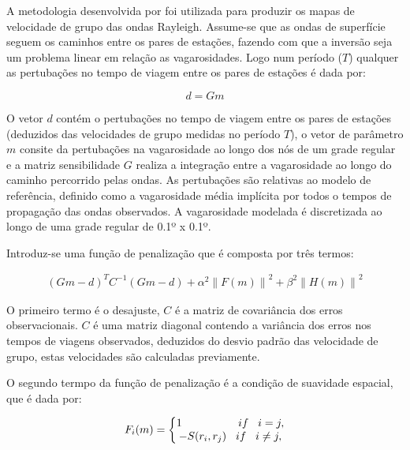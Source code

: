 A metodologia desenvolvida por  \cite{barmin_fast_2001} foi utilizada para produzir os mapas de velocidade de grupo das ondas Rayleigh. Assume-se que as ondas de superfície seguem os caminhos entre os pares de estações, fazendo com que a inversão seja um problema linear em relação as vagarosidades. Logo num período ($T$) qualquer as pertubações no tempo de viagem entre os pares de estações é dada por:

\begin{equation}
d=Gm
\end{equation} 

O vetor $d$ contém o pertubações no tempo de viagem entre os pares de estações (deduzidos das velocidades de grupo medidas no período $T$), o vetor de parâmetro $m$ consite da pertubações na vagarosidade ao longo dos nós de um grade regular e a matriz sensibilidade $G$ realiza a integração entre a vagarosidade ao longo do caminho percorrido pelas ondas. As pertubações são relativas ao modelo de referência, definido como a vagarosidade média implícita por todos o tempos de propagação das ondas observados. A vagarosidade modelada é discretizada ao longo de uma grade regular de 0.1º x 0.1º. 

Introduz-se uma função de penalização que é composta por três termos:

\begin{eqnarray}
(Gm-d)^{T}C^{-1}(Gm-d) + \alpha ^{2} \left \| F(m)  \right \| ^{2} + \beta ^{2 } \left \| H(m)  \right \| ^{2}
\end{eqnarray}

O primeiro termo é o desajuste, $C$ é a matriz de covariância dos erros observacionais. $C$ é uma matriz diagonal contendo a variância dos erros nos tempos de viagens observados, deduzidos do desvio padrão das velocidade de grupo, estas velocidades são calculadas previamente. 

O segundo termpo da função de penalização é a condição de suavidade espacial, que é dada por:

\begin{eqnarray}
F_{i}(m)=
 \left\{\begin{matrix}
1 \hspace{18mm} if \hspace{3mm} i = j,
\\ 
-S(r_{i},r_{j}) \hspace{3mm} if \hspace{3mm} i \neq j,
\end{matrix}\right.
\end{eqnarray}

